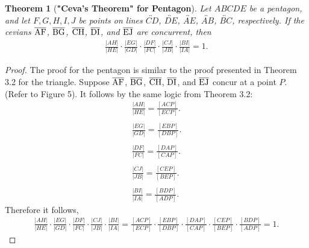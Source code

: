\documentclass[12pt,a4paper,reqno,parskip=full]{amsart}
\numberwithin{equation}{section}
\theoremstyle{plain}
\newtheorem{theorem}[subsection]{Theorem}
\theoremstyle{definition}
\begin{document}
\begin{theorem}[\textbf{"Ceva's Theorem" for Pentagon}]
Let $ABCDE$ be a pentagon, and let $F, G, H, I, J$ be points on lines $\overleftrightarrow{CD}$, $\overleftrightarrow{DE}$, $\overleftrightarrow{AE}$, $\overleftrightarrow{AB}$, $\overleftrightarrow{BC}$, respectively. If the cevians $\overline{\rm AF}$, $\overline{\rm BG}$, $\overline{\rm CH}$, $\overline{\rm DI}$, and $\overline{\rm EJ}$ are concurrent, then
\begin{align*}
\frac{|AH|}{|HE|}\cdot\frac{|EG|}{|GD|}\cdot\frac{|DF|}{|FC|}\cdot\frac{|CJ|}{|JB|}\cdot\frac{|BI|}{|IA|} = 1.
\end{align*}
\end{theorem}
\begin{proof}
The proof for the pentagon is similar to the proof presented in Theorem 3.2 for the triangle. Suppose $\overline{\rm AF}$, $\overline{\rm BG}$, $\overline{\rm CH}$, $\overline{\rm DI}$, and $\overline{\rm EJ}$ concur at a point $P$. (Refer to Figure 5). It follows by the same logic from Theorem 3.2:
\\
\begin{align*}
\frac{|AH|}{|HE|} = \frac{[ACP]}{[ECP]}.
\\
\\
\frac{|EG|}{|GD|} = \frac{[EBP]}{[DBP]}.
\\
\\
\frac{|DF|}{|FC|} = \frac{[DAP]}{[CAP]}.
\\
\\
\frac{|CJ|}{|JB|} = \frac{[CEP]}{[BEP]}.
\\
\\
\frac{|BI|}{|IA|} = \frac{[BDP]}{[ADP]}.
\end{align*}
Therefore it follows,
\\
\begin{align*}
\frac{|AH|}{|HE|}\cdot\frac{|EG|}{|GD|}\cdot\frac{|DF|}{|FC|}\cdot\frac{|CJ|}{|JB|}\cdot\frac{|BI|}{|IA|} = \frac{[ACP]}{[ECP]}\cdot\frac{[EBP]}{[DBP]}\cdot\frac{[DAP]}{[CAP]}\cdot\frac{[CEP]}{[BEP]}\cdot\frac{[BDP]}{[ADP]} = 1.
\end{align*}
\end{proof}
\end{document}

